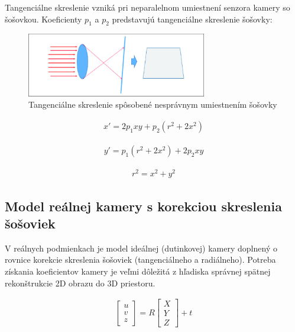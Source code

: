 Tangenciálne skreslenie vzniká pri neparalelnom umiestnení senzora kamery so šošovkou. Koeficienty $p_1$ a $p_2$ predstavujú tangenciálne skreslenie šošovky:

\begin{figure}[h]
	\centering
	\includegraphics[width=0.7\textwidth]{figures/tangential_distortion.png} 
	\caption{Tangenciálne skreslenie spôsobené nesprávnym umiestnením šošovky}
	\label{fig:tangential_distortion}
\end{figure}

\begin{equation}
\label{eq::tangential_dist::a}
\begin{aligned}
x'= 2p_{1}xy + p_{2}\left(r^{2} + 2x^{2}\right)
\end{aligned}
\end{equation}

\begin{equation}
\label{eq::tangential_dist::b}
\begin{aligned}
y'= p_{1}\left(r^{2} + 2x^{2}\right) + 2p_{2}xy
\end{aligned}
\end{equation}

\begin{equation}
\label{eq::tangential_dist::c}
\begin{aligned}
r^2=x^2+y^2
\end{aligned}
\end{equation}

\subsection{Model reálnej kamery s korekciou skreslenia šošoviek}

V reálnych podmienkach je model ideálnej (dutinkovej) kamery doplnený o rovnice korekcie skreslenia šošoviek (tangenciálneho a radiálneho). Potreba získania koeficientov kamery je veľmi dôležitá z hľadiska správnej spätnej rekonštrukcie 2D obrazu do 3D priestoru.

\begin{equation}
\label{eq::real_camera::a}
\begin{aligned}
\begin{bmatrix}
u \\ v \\ z
\end{bmatrix} = R
\begin{bmatrix}
X \\ Y \\ Z
\end{bmatrix} + t 
\end{aligned}
\end{equation}

